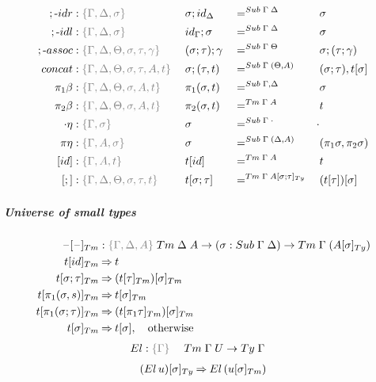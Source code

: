 \documentclass[a4paper,UKenglish,numberwithinsect,cleveref,thm-restate]{lipics-v2021}
\begin{document}
\begin{alignat*}{5}
  ;\text{-}\mathsf{idr}    & : \implicit{\Gamma, \Delta, \sigma}\; && {\sigma ; \idS_{\Delta}} && =^{\Sub\;\Gamma\;\Delta} && {\sigma} \\
  ;\text{-}\mathsf{idl}    & : \implicit{\Gamma, \Delta, \sigma}\; && {\idS_{\Gamma} ; \sigma} && =^{\Sub\;\Gamma\;\Delta} && {\sigma} \\
  ;\text{-}\mathsf{assoc} & : \implicit{\Gamma, \Delta, \Theta, \sigma, \tau, \gamma}\; && (\sigma ; \tau) ; \gamma && =^{\Sub\;\Gamma\;\Theta} &&  \sigma ; (\tau ; \gamma) \\
  \mathsf{concat} & : \implicit{\Gamma, \Delta, \Theta, \sigma, \tau, A, t}\; &&\sigma ; (\tau , t) && =^{\Sub\;\Gamma\;(\Theta, A)} &&  (\sigma ; \tau) , \sub{t}{\sigma} \\
  \pi_1\beta      & : \implicit{\Gamma, \Delta, \Theta, \sigma, A, t}\; && \pi_1(\sigma , t)        && =^{\Sub\;\Gamma,\Delta} &&  \sigma \\
  \pi_2\beta      & : \implicit{\Gamma, \Delta, \Theta, \sigma, A, t}\; && \pi_2(\sigma , t)        && =^{\Tm\;\Gamma\; A} &&  t \\
  \emptyctx\eta   & : \implicit{\Gamma, \sigma}\; && \sigma                   && =^{\Sub\;\Gamma\;\emptyctx} & \emptysub \\
  \pi\eta         & : \implicit{\Gamma, A, \sigma}\; && \sigma                   && =^{\Sub\;\Gamma\;(\Delta, A)} &&  (\pi_1 \sigma, \pi_2 \sigma) \\
  [\idS]         & : \implicit{\Gamma, A, t}\; && {\sub{t}{\idS}}          && =^{\Tm\;\Gamma\;A} && t \\
  [;]            & :\implicit{\Gamma, \Delta, \Theta, \sigma, \tau, t}\; && {\sub{t}{\sigma ; \tau}} && =^{\Tm\;\Gamma\;\subTy{A}{\sigma ; \tau}} && {\sub{(\sub{t}{\tau})}{\sigma}}
\end{alignat*}

\subparagraph*{Universe of small types}
\begin{alignat*}{5}
  \subTm{\blank}{\blank}            & : \implicit{\Gamma, \Delta, A}\; \Tm\;\Delta\;A \to (\sigma : \Sub\;\Gamma\;\Delta) \to  \Tm\;\Gamma\;(\subTy{A}{\sigma}) \\
 \subTm{t}{\idS}                & \reduce t \\
 \subTm{t}{\sigma ; \tau}       & \reduce \subTm{(\subTm{t}{\tau})}{\sigma} \\
 \subTm{t}{\pi_1(\sigma, s)}    & \reduce \subTm{t}{\sigma} \\
 \subTm{t}{\pi_1(\sigma; \tau)} & \reduce \subTm{(\subTm{t}{\pi_1\tau})}{\sigma} \\
 \subTm{t}{\sigma}              & \reduce \sub{t}{\sigma}, \quad \text{otherwise}
\end{alignat*}
%
\begin{alignat*}{5}
  \El       & : \implicit{\Gamma}\; && \Tm\;\Gamma\;U \to \Ty\;\Gamma
\end{alignat*}
%
\begin{alignat*}{3}
  \subTy{(\El\, u)}{\sigma} \reduce \El\,(\subTm{u}{\sigma})
\end{alignat*}
\end{document}
